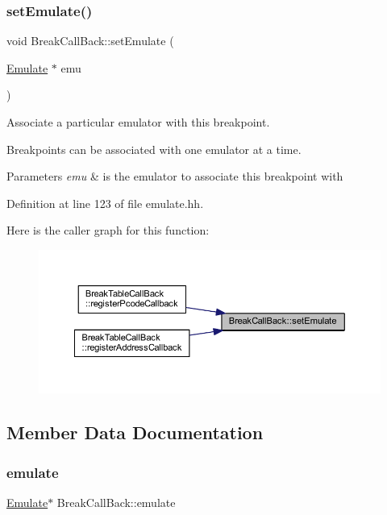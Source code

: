 \subsubsection{\texorpdfstring{setEmulate()}{setEmulate()}}
{\footnotesize\ttfamily void Break\+Call\+Back\+::set\+Emulate (\begin{DoxyParamCaption}\item[{\mbox{\hyperlink{class_emulate}{Emulate}} $\ast$}]{emu }\end{DoxyParamCaption})\hspace{0.3cm}{\ttfamily [inline]}}



Associate a particular emulator with this breakpoint. 

Breakpoints can be associated with one emulator at a time. 
\begin{DoxyParams}{Parameters}
{\em emu} & is the emulator to associate this breakpoint with \\
\hline
\end{DoxyParams}


Definition at line 123 of file emulate.\+hh.

Here is the caller graph for this function\+:
\nopagebreak
\begin{figure}[H]
\begin{center}
\leavevmode
\includegraphics[width=350pt]{class_break_call_back_a22f41c29017f4977efde2a489b07592b_icgraph}
\end{center}
\end{figure}


\subsection{Member Data Documentation}
\mbox{\label{class_break_call_back_a8047349836361935e9885bd36819255c}} 
\subsubsection{\texorpdfstring{emulate}{emulate}}
{\footnotesize\ttfamily \mbox{\hyperlink{class_emulate}{Emulate}}$\ast$ Break\+Call\+Back\+::emulate\hspace{0.3cm}{\ttfamily [protected]}}



